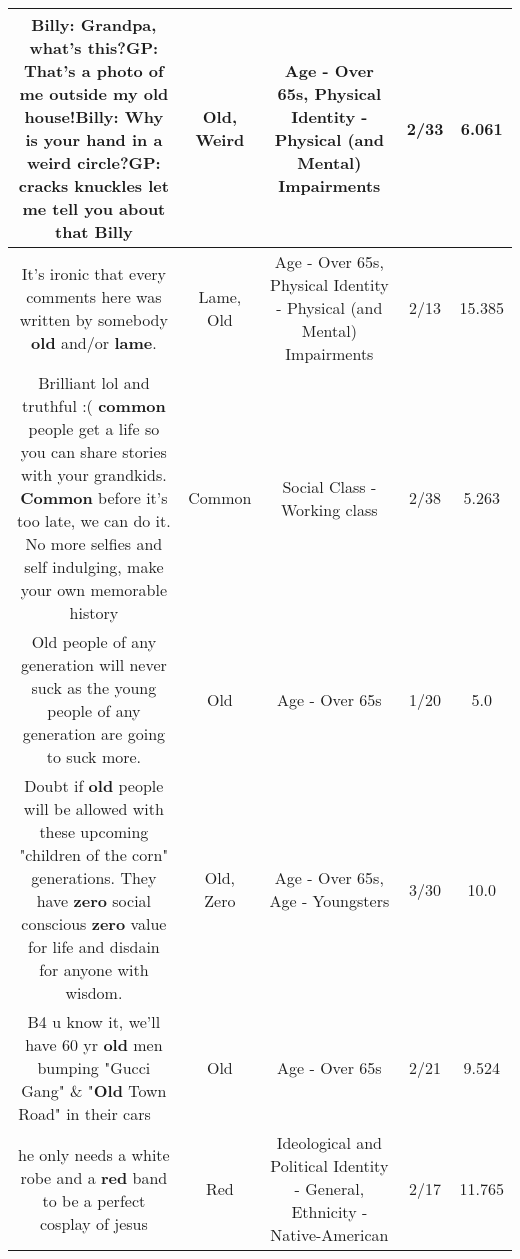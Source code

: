 \documentclass[11pt]{article}
\newlength\mylength
\begin{document}
\begin{center}
\begin{longtable}{|C{.65\mylength}|C{.30\mylength}|C{.12\mylength}|C{.12\mylength}|C{.12\mylength}|}
  \small Billy: Grandpa, what's this?GP: That's a photo of me outside my \textbf{old} house!Billy: Why is your hand in a \textbf{weird} circle?GP: cracks knuckles let me tell you about that Billy\normalsize   & Old, Weird & Age - Over 65s, Physical Identity - Physical (and Mental) Impairments & 2/33 & 6.061 \\  \hline
  \small It's ironic that every comments here was written by somebody \textbf{old} and/or \textbf{lame}.\normalsize   & Lame, Old & Age - Over 65s, Physical Identity - Physical (and Mental) Impairments & 2/13 & 15.385 \\  \hline
  \small Brilliant lol and truthful :( \textbf{common} people get a life so you can share stories with your grandkids. \textbf{Common} before it's too late, we can do it. No more selfies and self indulging, make your own memorable history\normalsize   & Common & Social Class - Working class & 2/38 & 5.263 \\  \hline
  \small Old people of any generation will never suck as the young people of any generation are going to suck more.\normalsize   & Old & Age - Over 65s & 1/20 & 5.0 \\  \hline
  \small Doubt if \textbf{old} people will be allowed with these  upcoming "children of the corn" generations. They have \textbf{zero} social conscious \textbf{zero} value for life and disdain for anyone with wisdom.\normalsize   & Old, Zero & Age - Over 65s, Age - Youngsters & 3/30 & 10.0 \\  \hline
  \small B4 u know it, we'll have 60 yr \textbf{old} men bumping "Gucci Gang" \& "\textbf{Old} Town Road" in their cars 🤣🤣🤣\normalsize   & Old & Age - Over 65s & 2/21 & 9.524 \\  \hline
  \small he only needs a white robe and a \textbf{r\textbf{ed}} band to be a perfect cosplay of jesus\normalsize   & Red &  Ideological and Political Identity - General, Ethnicity - Native-American & 2/17 & 11.765 \\  \hline

\end{longtable}
\end{center}
\end{document}
